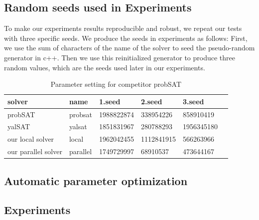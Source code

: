 \documentclass[12pt,a4paper,twoside]{scrartcl}
\numberwithin{equation}{section}
\begin{document}
\subsection{Random seeds used in Experiments}
To make our experiments results reproducible and robust, we repeat our tests with three specific seeds. We produce the seeds in experiments as follows: First, we use the sum of characters of the name of the solver to seed the pseudo-random generator in c++.  Then we use this reinitialized generator to produce three random values, which are the seeds used later in our experiments. 
\begin{table}[h!]
\begin{center}
    \begin{tabular}{|l|l|l|l|l|p{1cm}|}
\hline 
    solver&name&1.seed&2.seed&3.seed \\ \hline
	probSAT&probsat&1988822874&338954226 &858910419 \\ \hline
	yalSAT &yalsat&1851831967&280788293&1956345180 \\ \hline
	our local solver & local&1962042455&1112841915&566263966 \\ \hline
	our parallel solver & parallel &1749729997& 68910537& 473644167 \\ \hline
	
\end{tabular}
\caption[probSAT]{Parameter setting for competitor probSAT}
\end{center}
\end{table} 




\subsection{Automatic parameter optimization}
\subsection{Experiments}
\end{document}

